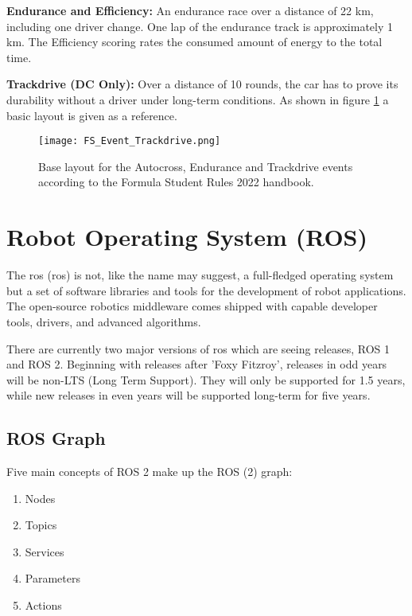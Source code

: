 \textbf{Endurance and Efficiency:} An endurance race over a distance of 22 km, including one driver change. One lap of the endurance track is approximately 1 km. The Efficiency scoring rates the consumed amount of energy to the total time.

\textbf{Trackdrive (DC Only):}  Over a distance of 10 rounds, the car has to prove its durability without a driver under long-term conditions. As shown in figure \ref{fig:FS Autocross, Endurance and Trackdrive layout} a basic layout is given as a reference.
\begin{figure}[H]
    \centering
    \texttt{[image: FS\_Event\_Trackdrive.png]}
    \caption{Base layout for the Autocross, Endurance and Trackdrive events according to the Formula Student Rules 2022 handbook. \cite{fs_rules_2022_handbook}}
    \label{fig:FS Autocross, Endurance and Trackdrive layout}
\end{figure}

\section{Robot Operating System (ROS)} \label{sec:Robot Operating System (ROS)}
The \acrlong{ros} (\acrshort{ros}) is not, like the name may suggest, a full-fledged operating system but a set of software libraries and tools for the development of robot applications. The open-source robotics middleware comes shipped with capable developer tools, drivers, and advanced algorithms. \cite{ros2_documentation}

There are currently two major versions of \acrshort{ros} which are seeing releases, ROS 1 and ROS 2. \cite{ros2_documentation} Beginning with releases after 'Foxy Fitzroy', releases in odd years will be non-LTS (Long Term Support). They will only be supported for 1.5 years, while new releases in even years will be supported long-term for five years. \cite{ros2_documentation}

\subsection{ROS Graph} \label{sec:ROS Graph}
Five main concepts of ROS 2 make up the ROS (2) graph:
\begin{enumerate}
    \item Nodes
    \item Topics
    \item Services
    \item Parameters
    \item Actions
\end{enumerate}

